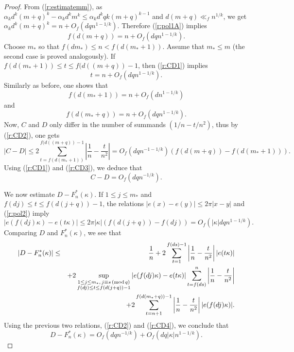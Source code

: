 \documentclass{amsart}
\numberwithin {equation}{section}
\begin{document}
\begin{proof}
From (\ref{r:estimatemm}), as $\alpha _{k}d^{k}(m+q)^{k}-\alpha
_{k}d^{k}m^{k}\leq \alpha _{k}d^{k}qk(m+q)^{k-1}$ and $d(m+q)\ll _{f}n^{1/k}$, we get $\alpha _{k}d^{k}(m+q)^{k}=n+O_{f}(dqn^{1-1/k})$. Therefore (\ref{r:pol1A}) implies 
\begin{equation}
f(d(m+q))=n+O_{f}(dqn^{1-1/k}).  \label{r:CD1}
\end{equation}Choose $m_{\ast }$ so that $f(dm_{\ast })\leq n<f(d(m_{\ast }+1))$. Assume
that $m_{\ast }\leq m$ (the second case is proved analogously). If $f(d(m_{\ast }+1))\leq t\leq f(d((m+q))-1$, then (\ref{r:CD1}) implies 
\begin{equation}
t=n+O_{f}(dqn^{1-1/k}).  \label{r:CD2}
\end{equation}Similarly as before, one shows that 
\begin{equation}
f(d(m_{\ast }+1))=n+O_{f}(dn^{1-1/k})  \label{r:CD3}
\end{equation}and 
\begin{equation}
f(d(m_{\ast }+q))=n+O_{f}(dqn^{1-1/k}).  \label{r:CD4}
\end{equation}Now, $C$ and $D$ only differ in the number of summands $(1/n-t/n^{2})$, thus
by (\ref{r:CD2}), one gets 
\begin{equation*}
|C-D|\leq 2\sum_{t=f(d(m_{\ast }+1))}^{f(d((m+q))-1}\left\vert \frac{1}{n}-\frac{t}{n^{2}}\right\vert =O_{f}(dqn^{-1-1/k})(f(d(m+q))-f(d(m_{\ast }+1))){\text{.}}
\end{equation*}Using (\ref{r:CD1}) and (\ref{r:CD3}), we deduce that 
\begin{equation}
C-D=O_{f}(dqn^{-1/k}).  \label{r:CCDD}
\end{equation}

We now estimate $D-F_{n}^{\ast }(\kappa )$. If $1\leq j\leq m_*$ and $f(dj)\leq t\leq f(d(j+q))-1$, the relations $|e(x)-e(y)|\leq 2\pi |x-y|$ and
(\ref{r:pol2}) imply 
\begin{equation*}
|e(f(dj)\kappa )-e(t\kappa )|\leq 2\pi |\kappa
|(f(d(j+q))-f(dj))=O_{f}(|\kappa |dqn^{1-1/k}){\text {.}}
\end{equation*}
Comparing $D$ and $F_{n}^{\ast }(\kappa )$, we see that 
\begin{eqnarray}
|D-F_{n}^{\ast }(\kappa )|&\leq &\frac{1}{n}+2\sum _{t=1}^{f(ds)-1}\left |\frac{1}{n}-\frac{t}{n^{2}}\right ||e(t\kappa )|  \notag \\
&&+2\sup _{\substack{ 1\leq j\leq m_*,\,j\equiv s\,({\mathrm{mod}}\,q)  \\ f(dj)\leq t\leq f(d(j+q))-1}}|e(f(dj)\kappa )-e(t\kappa )|\sum
_{t=f(ds)}^{n}\left |\frac{1}{n}-\frac{t}{n^{2}}\right |  \notag \\
&&+2\sum _{t=n+1}^{f(d(m_*+q))-1}\left |\frac{1}{n}-\frac{t}{n^{2}}\right
||e(f(dj)\kappa )|.  \notag
\end{eqnarray}
Using the previous two relations, (\ref{r:CD2}) and (\ref{r:CD4}), we
conclude that 
\begin{equation}
D-F_{n}^{\ast }(\kappa )=O_{f}(dqn^{-1/k})+O_{f}(dq|\kappa |n^{1-1/k}){\text {.}}  \label{r:CF}
\end{equation}


\end{proof}
\end{document}
